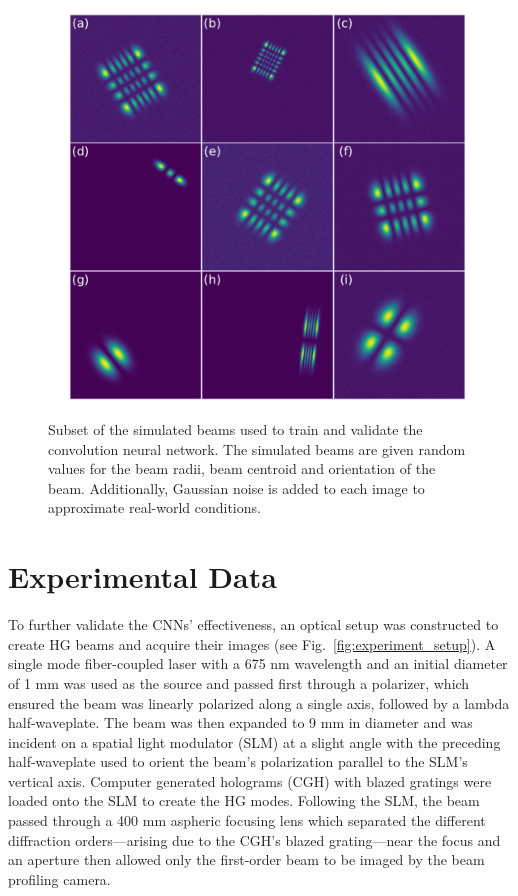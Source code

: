 \documentclass[10pt,journal,compsoc]{IEEEtran}
\begin{document}
\begin{figure}%
\centering %
\includegraphics[width=.45\textwidth]{simulated_modes.pdf} %
\caption[Table of Contents Figure Caption]{Subset of the simulated beams used to train and validate the convolution neural network. The simulated beams are given random values for the beam radii, beam centroid and orientation of the beam. Additionally, Gaussian noise is added to each image to approximate real-world conditions.}%
\label{fig:simulated_data} %
\end{figure}

\section*{Experimental Data}
To further validate the CNNs' effectiveness, an optical setup was constructed to create HG beams and acquire their images (see Fig.~\ref{fig:experiment_setup}). A single mode fiber-coupled laser with a 675 nm wavelength and an initial diameter of 1 mm was used as the source and passed first through a polarizer, which ensured the beam was linearly polarized along a single axis, followed by a lambda half-waveplate. The beam was then expanded to 9 mm in diameter and was incident on a spatial light modulator (SLM) at a slight angle with the preceding half-waveplate used to orient the beam's polarization parallel to the SLM's vertical axis. Computer generated holograms (CGH) with blazed gratings were loaded onto the SLM to create the HG modes. Following the SLM, the beam passed through a 400 mm aspheric focusing lens which separated the different diffraction orders---arising due to the CGH's blazed grating---near the focus and an aperture then allowed only the first-order beam to be imaged by the beam profiling camera.%
\end{document}
